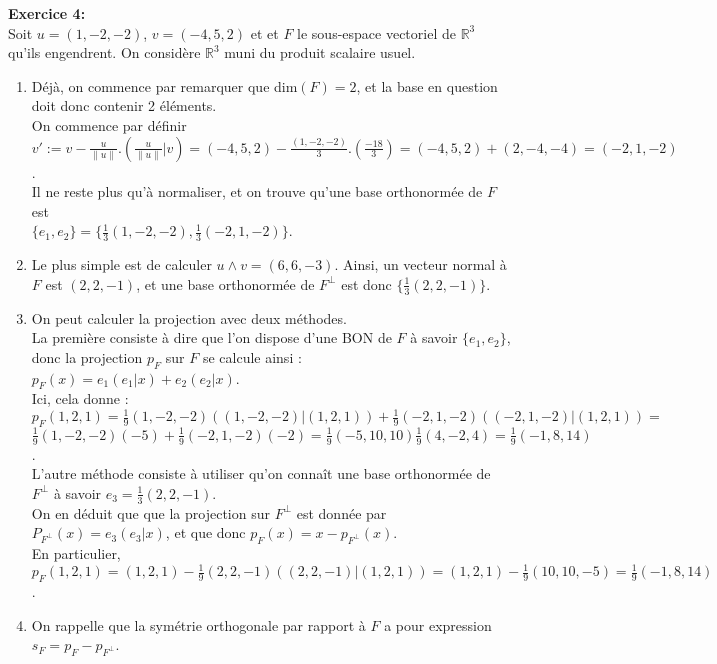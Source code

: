 \documentclass[a4paper, 10pt]{article}
\theoremstyle{plain}
\newcommand{\R}{\mathbb{R}}
\begin{document}
\bigskip
\noindent
\textbf{Exercice 4:}\\
Soit 
$u=(1,-2,-2)$,  
$v=(-4,5,2)$ et et $F$ le sous-espace vectoriel de 
$\R^3$ qu'ils engendrent. On considère $\R^3$ muni 
du produit scalaire usuel.
\begin{enumerate}
\item 
Déjà, on commence par remarquer que dim$(F)=2$, et la base en question doit donc contenir 2 
éléments. \\
On commence par définir \\
$v' :=  v - \frac{u}{\|u\|} . \left( \frac{u}{\|u\|} | v\right) = 
(-4,5,2) - \frac{ (1,-2,-2)}{3} . (\frac{-18}{3}) = (-4,5,2)+(2,-4,-4)
=(-2,1,-2)$.\\
Il ne reste plus qu'à normaliser, et on trouve qu'une base orthonormée de $F$ est \\
$\{e_1,e_2\}=\{\frac{1}{3} ( 1,-2,-2) , \frac{1}{3}(-2,1,-2) \}$.
\item 
Le plus simple est de calculer $u\wedge v = (6,6,-3)$. Ainsi, un vecteur normal 
à $F$ est $(2,2,-1)$, et une base orthonormée de $F^{\perp}$ est donc 
$\{ \frac{1}{3} (2,2,-1)\}$. 
\item 
On peut calculer la projection avec deux méthodes. \\
La première consiste à dire que l'on dispose d'une BON de $F$ à savoir $\{e_1,e_2\}$, donc 
la projection $p_F$ sur $F$ se calcule ainsi : \\
$p_F(x) = e_1 (e_1|x) + e_2(e_2|x)$.\\
Ici, cela donne : \\ 
$p_F(1,2,1) =  \frac{1}{9} (1,-2,-2) ((1,-2,-2)|(1,2,1))  + \frac{1}{9}(-2,1,-2)((-2,1,-2)|(1,2,1)) =$\\
$\frac{1}{9} (1,-2,-2) (-5)  + \frac{1}{9}(-2,1,-2)(-2) =
\frac{1}{9} (-5,10,10)  \frac{1}{9}(4,-2,4) = \frac{1}{9}  (-1,8,14)$. \\
L'autre méthode consiste à utiliser qu'on connaît une base orthonormée de 
$F^{\perp}$ à savoir $e_3 = \frac{1}{3} (2,2,-1) $. \\
On en déduit que 
que la projection sur $F^{\perp}$ 
est donnée par 
$P_{F^{\perp}} (x) =   e_3 (e_3|x)$, et que donc 
$p_F(x) = x-p_{F^{\perp} } (x)$.\\
En particulier, 
$p_F(1,2,1) = (1,2,1) - \frac{1}{9} (2,2,-1) ( (2,2,-1) | ( 1,2,1) ) 
= (1,2,1) - \frac{1}{9} ( 10,10,-5) = 
\frac{1}{9} ( -1,8,14)$. 
\item 
On rappelle que la symétrie orthogonale par rapport à $F$ a pour expression 
$s_F = p_{F} - p_{F^{\perp} }$. \\ 

\end{enumerate}
\end{document}
